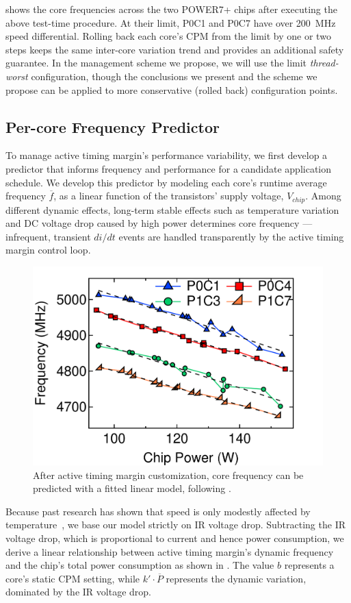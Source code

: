  shows the core frequencies across the two POWER7+ chips after executing the above test-time procedure. At their limit, P0C1 and P0C7 have over 200~MHz speed differential. Rolling back each core's CPM from the limit by one or two steps keeps the same inter-core variation trend and provides an additional safety guarantee. In the management scheme we propose, we will use the limit \textit{thread-worst} configuration, though the conclusions we present and the scheme we propose can be applied to more conservative (rolled back) configuration points.

\subsection{Per-core Frequency Predictor}
\label{sec:process:schedule:predict}

To manage active timing margin's performance variability, we first develop a predictor that informs frequency and performance for a candidate application schedule. We develop this predictor by modeling each core's runtime average frequency $\overline{f}$, as a linear function of the transistors' supply voltage, $V_{chip}$. Among different dynamic effects, long-term stable effects such as temperature variation and DC voltage drop caused by high power determines core frequency ---infrequent, transient $di/dt$ events are handled transparently by the active timing margin control loop. 

\begin{figure}[t]
  \centering
      \includegraphics[trim=0 0 0 0,clip,width=.6\linewidth]{graphs/process/freq-pred.pdf}
      \captionsetup{width=.9\linewidth}
      \caption{After active timing margin customization, core frequency can be predicted with a fitted linear model, following .}
\label{fig:freq-pred}
\end{figure}

Because past research has shown that speed is only modestly affected by temperature~\cite{zu2016tistate}, we base our model strictly on IR voltage drop. Subtracting the IR voltage drop, which is proportional to current and hence power consumption, we derive a linear relationship between active timing margin's dynamic frequency and the chip's total power consumption as shown in  . The value $b$ represents a core's static CPM setting, while $k' \cdot \overline{P}$ represents the dynamic variation, dominated by the IR voltage drop. 

